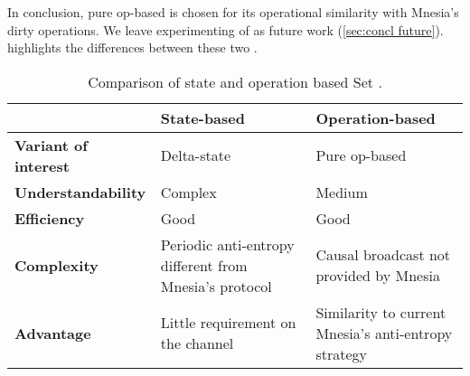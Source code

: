 In conclusion, pure op-based  is chosen for its operational
similarity with Mnesia's dirty operations. We leave experimenting of
 as future work (\cref{sec:concl future}).
 highlights the differences between these 
two .

\begin{table}[htp]
  \centering
  \begin{tabular}{p{}p{}p{}}
    \toprule
    &   State-based & Operation-based \\ \midrule
    \textbf{Variant of interest} & Delta-state & Pure op-based \\ \midrule
    \textbf{Understandability} & Complex & Medium \\ \midrule
    \textbf{Efficiency} & Good & Good \\ \midrule
    \textbf{Complexity} & Periodic anti-entropy different from Mnesia's protocol & Causal broadcast not provided by Mnesia \\ \midrule
    \textbf{Advantage} & Little requirement on the channel & Similarity to current Mnesia's anti-entropy strategy \\
    \bottomrule
  \end{tabular}
  \caption{Comparison of state and operation based Set .}
  \label{tab:crdt comparison}

\end{table}
